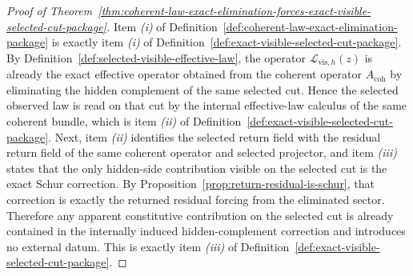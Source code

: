 \begin{proof}[Proof of Theorem~\ref{thm:coherent-law-exact-elimination-forces-exact-visible-selected-cut-package}]
\label{proof:thm:coherent-law-exact-elimination-forces-exact-visible-selected-cut-package}
Item \emph{(i)} of
Definition~\ref{def:coherent-law-exact-elimination-package} is exactly item
\emph{(i)} of Definition~\ref{def:exact-visible-selected-cut-package}. By
Definition~\ref{def:selected-visible-effective-law}, the operator
\(\mathcal L_{\mathrm{vis},h}(z)\) is already the exact effective operator
obtained from the coherent operator \(A_{\mathrm{coh}}\) by eliminating the
hidden complement of the same selected cut. Hence the selected observed law is
read on that cut by the internal effective-law calculus of the same coherent
bundle, which is item \emph{(ii)} of
Definition~\ref{def:exact-visible-selected-cut-package}. Next, item
\emph{(ii)} identifies the selected return field with the residual return field
of the same coherent operator and selected projector, and item \emph{(iii)}
states that the only hidden-side contribution visible on the selected cut is
the exact Schur correction. By
Proposition~\ref{prop:return-residual-is-schur}, that correction is exactly the
returned residual forcing from the eliminated sector. Therefore any apparent
constitutive contribution on the selected cut is already contained in the
internally induced hidden-complement correction and introduces no external
datum. This is exactly item \emph{(iii)} of
Definition~\ref{def:exact-visible-selected-cut-package}.
\end{proof}


